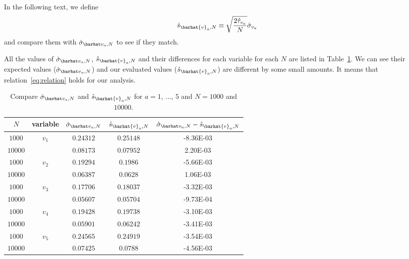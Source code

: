 In the following text, we define
%
\begin{equation}
    \hat{s}_{\barhat{v}_a,N} \equiv \sqrt{\frac{ 2 \hat{\tau}_{v_a} }{ N }} \hat{\sigma}_{v_a}
\end{equation}
%
and compare them with $\sgbar{a}$ to see if they match.

All the values of $\sgbar{a}$, $\hat{s}_{\barhat{v}_a,N}$ and their differences
for each variable for each $N$ are listed in Table~\ref{tab:s}.
We can see their expected values ($\sgbar{a}$) and our evaluated values
($\hat{s}_{\barhat{v}_a,N}$) are different by some small amounts.
It means that relation~\eqref{eq:relation} holds for our analysis.

\begin{table}[H]
    \centering
    \caption{Compare $\sgbar{a}$ and $\hat{s}_{\barhat{v}_a,N}$ for
    $a = 1$, $\ldots$, $5$ and $N = 1000$ and $10000$.}
    \label{tab:s}
    \begin{tabular}{@{}ccccc@{}}
        \toprule
        $N$     & variable               & $\sgbar{a}$ & $\hat{s}_{\barhat{v}_a,N}$ & $\sgbar{a}-\hat{s}_{\barhat{v}_a,N}$ \\
        \midrule
        $1000$  & \multirow{2}{*}{$v_1$} & $0.24312$   & $0.25148$                  & \num{-8.36E-03}                      \\
        $10000$ &                        & $0.08173$   & $0.07952$                  & \num{2.20E-03}                       \\
        \cmidrule{1-2}
        $1000$  & \multirow{2}{*}{$v_2$} & $0.19294$   & $0.1986$                   & \num{-5.66E-03}                      \\
        $10000$ &                        & $0.06387$   & $0.0628$                   & \num{1.06E-03}                       \\
        \cmidrule{1-2}
        $1000$  & \multirow{2}{*}{$v_3$} & $0.17706$   & $0.18037$                  & \num{-3.32E-03}                      \\
        $10000$ &                        & $0.05607$   & $0.05704$                  & \num{-9.73E-04}                      \\
        \cmidrule{1-2}
        $1000$  & \multirow{2}{*}{$v_4$} & $0.19428$   & $0.19738$                  & \num{-3.10E-03}                      \\
        $10000$ &                        & $0.05901$   & $0.06242$                  & \num{-3.41E-03}                      \\
        \cmidrule{1-2}
        $1000$  & \multirow{2}{*}{$v_5$} & $0.24565$   & $0.24919$                  & \num{-3.54E-03}                      \\
        $10000$ &                        & $0.07425$   & $0.0788$                   & \num{-4.56E-03}                      \\
        \bottomrule
    \end{tabular}
\end{table}

